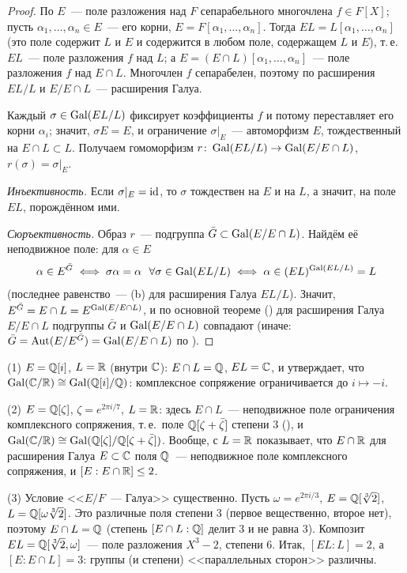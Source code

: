 \begin{proof}
По  $E$~--- поле разложения над $F$ сепарабельного многочлена $f\in F[X]$; пусть $\alpha_1,\dots,\alpha_n\in E$~---
его корни, $E=F[\alpha_1,\dots,\alpha_n]$. Тогда $EL=L[\alpha_1,\dots,\alpha_n]$ (это поле содержит $L$ и $E$ и содержится в любом
поле, содержащем $L$ и $E$), т.\,е.\ $EL$~--- поле разложения $f$ над $L$; а $E=(E\cap L)[\alpha_1,\dots,\alpha_n]$~--- поле
разложения $f$ над $E\cap L$. Многочлен $f$ сепарабелен, поэтому по  расширения $EL/L$ и $E/E\cap L$~---
расширения Галуа.

Каждый $\sigma\in\operatorname{Gal}(EL/L)$ фиксирует коэффициенты $f$ и потому переставляет его корни $\alpha_i$; значит, $\sigma E=E$, и
ограничение $\sigma|_E$~--- автоморфизм $E$, тождественный на $E\cap L\subset L$. Получаем гомоморфизм
$r\colon\operatorname{Gal}(EL/L)\to\operatorname{Gal}(E/E\cap L)$, $r(\sigma)=\sigma|_E$.

\emph{Инъективность.} Если $\sigma|_E=\operatorname{id}$, то $\sigma$ тождествен на $E$ и на $L$, а значит, на поле $EL$, порождённом ими.

\emph{Сюръективность.} Образ $r$~--- подгруппа $\bar G\subset\operatorname{Gal}(E/E\cap L)$. Найдём её неподвижное поле: для $\alpha\in E$
\[
\alpha\in E^{\bar G}\iff\sigma\alpha=\alpha\ \ \forall\sigma\in\Gal(EL/L)\iff\alpha\in(EL)^{\Gal(EL/L)}=L
\]
(последнее равенство~--- (b) для расширения Галуа $EL/L$). Значит, $E^{\bar G}=E\cap L=E^{\operatorname{Gal}(E/E\cap L)}$, и по
основной теореме () для расширения Галуа $E/E\cap L$ подгруппы $\bar G$ и $\operatorname{Gal}(E/E\cap L)$ совпадают (иначе:
$\bar G=\operatorname{Aut}(E/E^{\bar G})=\operatorname{Gal}(E/E\cap L)$ по ).
\end{proof}

\begin{example}[3.19a]
(1) $E=\mathbb Q[i]$, $L=\mathbb R$ (внутри $\mathbb C$): $E\cap L=\mathbb Q$, $EL=\mathbb C$, и  утверждает, что $\operatorname{Gal}(\mathbb C/\mathbb R)\cong\operatorname{Gal}(\mathbb Q[i]/\mathbb Q)$:
комплексное сопряжение ограничивается до $i\mapsto-i$.

(2) $E=\mathbb Q[\zeta]$, $\zeta=e^{2\pi i/7}$, $L=\mathbb R$: здесь $E\cap L$~--- неподвижное поле ограничения комплексного сопряжения,
т.\,е.\ поле $\mathbb Q[\zeta+\bar\zeta]$ степени $3$ (), и $\operatorname{Gal}(\mathbb C/\mathbb R)\cong\operatorname{Gal}(\mathbb Q[\zeta]/\mathbb Q[\zeta+\bar\zeta])$. Вообще,
 с $L=\mathbb R$ показывает, что $E\cap\mathbb R$ для расширения Галуа $E\subset\mathbb C$ поля $\mathbb Q$~--- неподвижное поле
комплексного сопряжения, и $[E:E\cap\mathbb R]\le2$.

(3) Условие <<$E/F$~--- Галуа>> существенно. Пусть $\omega=e^{2\pi i/3}$, $E=\mathbb Q[\sqrt[3]2]$, $L=\mathbb Q[\omega\sqrt[3]2]$. Это
различные поля степени $3$ (первое вещественно, второе нет), поэтому $E\cap L=\mathbb Q$ (степень $[E\cap L:\mathbb Q]$ делит $3$ и не
равна $3$). Композит $EL=\mathbb Q[\sqrt[3]2,\omega]$~--- поле разложения $X^3-2$, степени $6$. Итак, $[EL:L]=2$, а
$[E:E\cap L]=3$: группы (и степени) <<параллельных сторон>> различны.
\end{example}

